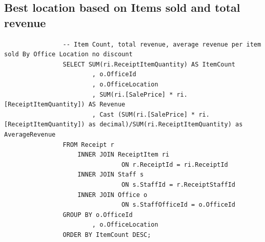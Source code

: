\documentclass{article}
\begin{document}
             
            
            \subsection{Best location based on Items sold and total revenue}
               
                \begin{lstlisting}
				-- Item Count, total revenue, average revenue per item sold By Office Location no discount
				SELECT SUM(ri.ReceiptItemQuantity) AS ItemCount
						, o.OfficeId
						, o.OfficeLocation
						, SUM(ri.[SalePrice] * ri.[ReceiptItemQuantity]) AS Revenue
						, Cast (SUM(ri.[SalePrice] * ri.[ReceiptItemQuantity]) as decimal)/SUM(ri.ReceiptItemQuantity) as AverageRevenue
				FROM Receipt r
					INNER JOIN ReceiptItem ri
								ON r.ReceiptId = ri.ReceiptId
					INNER JOIN Staff s
								ON s.StaffId = r.ReceiptStaffId
					INNER JOIN Office o
								ON s.StaffOfficeId = o.OfficeId
				GROUP BY o.OfficeId
						, o.OfficeLocation
				ORDER BY ItemCount DESC;
                \end{lstlisting}
\end{document}
